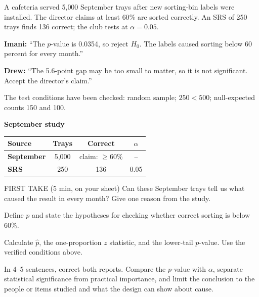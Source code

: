 \documentclass[14pt]{extarticle}
\begin{document}
\pagestyle{empty}


\noindent\begin{minipage}[t]{0.57\linewidth}
\vspace{0pt}
A cafeteria served 5{,}000 September trays after new sorting-bin labels were installed. The director claims at least $60\%$ are sorted correctly. An SRS of 250 trays finds 136 correct; the club tests at $\alpha=0.05$.\par\smallskip \textbf{Imani:} ``The $p$-value is 0.0354, so reject $H_0$. The labels caused sorting below 60 percent for every month.''\par \textbf{Drew:} ``The 5.6-point gap may be too small to matter, so it is not significant. Accept the director's claim.''\par\smallskip The test conditions have been checked: random sample; $250<500$; null-expected counts 150 and 100.\par
\end{minipage}\hfill
\begin{minipage}[t]{0.40\linewidth}
\vspace{0pt}
\begin{center}
\textbf{September study}\par\smallskip
\begin{tabular}{|l|c|c|c|}
\hline
\textbf{Source} & \textbf{Trays} & \textbf{Correct} & \textbf{$\alpha$} \\ \hline
\textbf{September} & 5,000 & claim: $\geq 60\%$ & -- \\ \hline
\textbf{SRS} & 250 & 136 & 0.05 \\ \hline
\end{tabular}
\end{center}
\end{minipage}

\begin{firsttakebox}{FIRST TAKE (5 min, on your sheet)}
Can these September trays tell us what caused the result in every month? Give one reason from the study.
\end{firsttakebox}

\begin{description}[leftmargin=1.15in, labelwidth=1in, itemsep=2pt, topsep=2pt]
  \item[\dokbadge{1}~(a)] Define $p$ and state the hypotheses for checking whether correct sorting is below 60\%.
  \item[\dokbadge{2}~(b)] Calculate $\widehat p$, the one-proportion $z$ statistic, and the lower-tail $p$-value. Use the verified conditions above.
  \item[\dokbadge{3}~(c)] In 4--5 sentences, correct both reports. Compare the $p$-value with $\alpha$, separate statistical significance from practical importance, and limit the conclusion to the people or items studied and what the design can show about cause.
\end{description}
\end{document}
